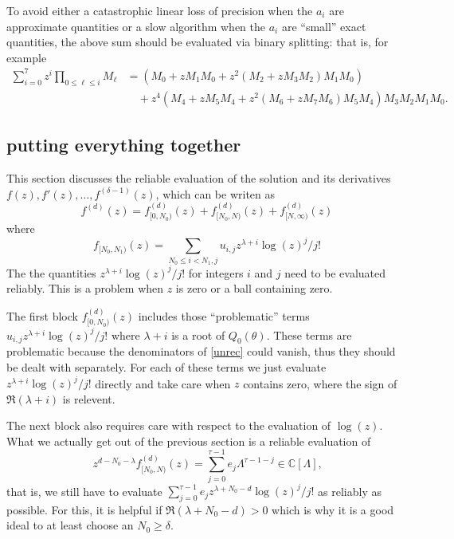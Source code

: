 \documentclass[10pt]{article}
\numberwithin{equation}{section}
\begin{document}
To avoid either a catastrophic linear loss of precision when the $a_i$ are approximate quantities or a slow algorithm when the $a_i$ are ``small'' exact quantities, the above sum should be evaluated via binary splitting: that is, for example
\begin{align*}
\sum_{i=0}^{7} z^{i} \prod_{0\le \ell \le i}M_{\ell} &= (M_0 + z M_1 M_0 + z^2(M_2 + z M_3 M_2) M_1 M_0)\\
& \quad + z^4 (M_4 + z M_5 M_4 + z^2(M_6 + z M_7 M_6) M_5 M_4)M_3 M_2 M_1 M_0\text{.}
\end{align*}

\subsection{putting everything together}
This section discusses the reliable evaluation of the solution and its derivatives $f(z), f'(z), \dots, f^{(\delta-1)}(z)$, which can be writen as
\begin{equation*}
f^{(d)}(z) = f_{[0,N_0)}^{(d)}(z) + f_{[N_0,N)}^{(d)}(z) + f_{[N,\infty)}^{(d)}(z)
\end{equation*}
where 
\begin{equation*}
f_{[N_0,N_1)}(z) = \sum_{N_0 \le i < N_1,j} u_{i,j} z^{\lambda+i} \log(z)^j/j!
\end{equation*}
The the quantities $z^{\lambda+i} \log(z)^j/j!$ for integers $i$ and $j$ need to be evaluated reliably. This is a problem when $z$ is zero or a ball containing zero.

The first block $f_{[0,N_0)}^{(d)}(z)$ includes those ``problematic'' terms $u_{i,j} z^{\lambda+i} \log(z)^j/j!$ where $\lambda+i$ is a root of $Q_0(\theta)$. These terms are problematic because the denominators of \eqref{unrec} could vanish, thus they should be dealt with separately. For each of these terms we just evaluate $z^{\lambda+i} \log(z)^j/j!$ directly and take care when $z$ contains zero, where the sign of $\Re(\lambda+i)$ is relevent.

The next block also requires care with respect to the evaluation of $\log(z)$. What we actually get out of the previous section is a reliable evaluation of
\begin{equation*}
z^{d - N_0 - \lambda} f_{[N_0,N)}^{(d)}(z) = \sum_{j=0}^{\tau-1} e_j \Lambda^{\tau-1-j} \in \mathbb{C}[\Lambda]\text{,}
\end{equation*}
that is, we still have to evaluate $\sum_{j=0}^{\tau-1} e_j z^{\lambda+N_0-d}\log(z)^j/j!$ as reliably as possible. For this, it is helpful if $\Re(\lambda+N_0-d) > 0$ which is why it is a good ideal to at least choose an $N_0 \ge \delta$.
\end{document}
